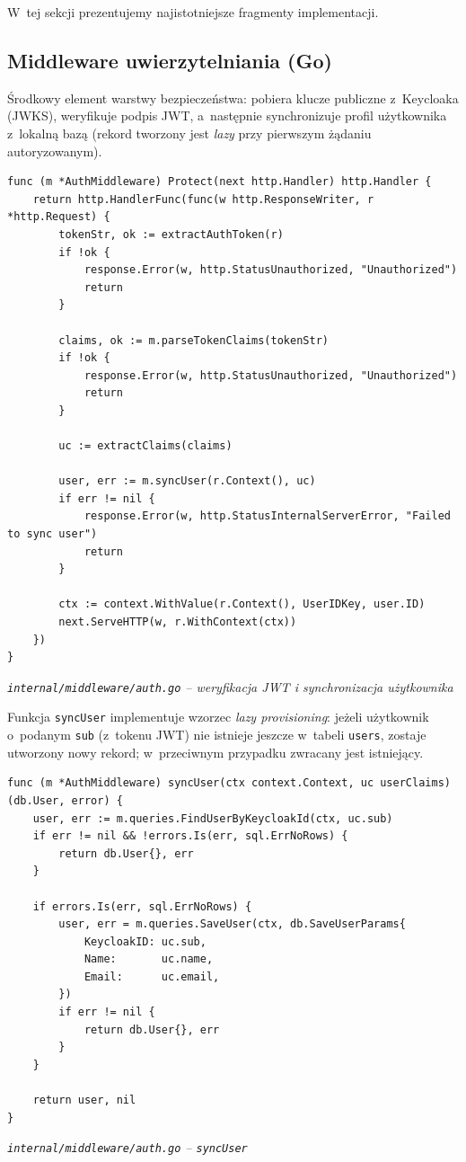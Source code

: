 \documentclass[12pt, a4paper, oneside]{article}
\newcommand{\codecaption}[1]{\par\vspace{-0.4em}\noindent\small\textit{#1}\par\vspace{0.3em}}
\begin{document}
W~tej sekcji prezentujemy najistotniejsze fragmenty implementacji.

\subsection{Middleware uwierzytelniania (Go)}
Środkowy element warstwy bezpieczeństwa: pobiera klucze publiczne
z~Keycloaka (JWKS), weryfikuje podpis JWT, a~następnie synchronizuje
profil użytkownika z~lokalną bazą (rekord tworzony jest \emph{lazy}
przy pierwszym żądaniu autoryzowanym).

\begin{verbatim}
func (m *AuthMiddleware) Protect(next http.Handler) http.Handler {
    return http.HandlerFunc(func(w http.ResponseWriter, r *http.Request) {
        tokenStr, ok := extractAuthToken(r)
        if !ok {
            response.Error(w, http.StatusUnauthorized, "Unauthorized")
            return
        }

        claims, ok := m.parseTokenClaims(tokenStr)
        if !ok {
            response.Error(w, http.StatusUnauthorized, "Unauthorized")
            return
        }

        uc := extractClaims(claims)

        user, err := m.syncUser(r.Context(), uc)
        if err != nil {
            response.Error(w, http.StatusInternalServerError, "Failed to sync user")
            return
        }

        ctx := context.WithValue(r.Context(), UserIDKey, user.ID)
        next.ServeHTTP(w, r.WithContext(ctx))
    })
}
\end{verbatim}
\codecaption{\texttt{internal/middleware/auth.go} -- weryfikacja JWT i synchronizacja użytkownika}

Funkcja \texttt{syncUser} implementuje wzorzec \emph{lazy provisioning}:
jeżeli użytkownik o~podanym \texttt{sub} (z~tokenu JWT) nie istnieje
jeszcze w~tabeli \texttt{users}, zostaje utworzony nowy rekord;
w~przeciwnym przypadku zwracany jest istniejący.

\begin{verbatim}
func (m *AuthMiddleware) syncUser(ctx context.Context, uc userClaims) (db.User, error) {
    user, err := m.queries.FindUserByKeycloakId(ctx, uc.sub)
    if err != nil && !errors.Is(err, sql.ErrNoRows) {
        return db.User{}, err
    }

    if errors.Is(err, sql.ErrNoRows) {
        user, err = m.queries.SaveUser(ctx, db.SaveUserParams{
            KeycloakID: uc.sub,
            Name:       uc.name,
            Email:      uc.email,
        })
        if err != nil {
            return db.User{}, err
        }
    }

    return user, nil
}
\end{verbatim}
\codecaption{\texttt{internal/middleware/auth.go} -- \texttt{syncUser}}
\end{document}
